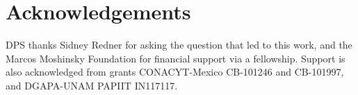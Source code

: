 \documentclass[superscriptaddress,pre,reprint,showpacs,twocolumn]{revtex4-1}
\begin{document}
    
    
\section*{Acknowledgements}


DPS thanks Sidney Redner for asking the question that led to this work, and the Marcos Moshinsky Foundation for financial support via a fellowship.
Support is also acknowledged from grants CONACYT-Mexico CB-101246 and CB-101997, and DGAPA-UNAM PAPIIT IN117117.





\end{document}
